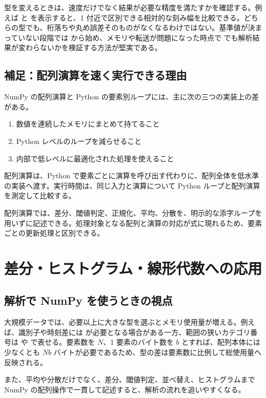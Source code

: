 型を変えるときは、速度だけでなく結果が必要な精度を満たすかを確認する。例えば  と  を表示すると、1 付近で区別できる相対的な刻み幅を比較できる。どちらの型でも、桁落ちや丸め誤差そのものがなくなるわけではない。基準値が決まっていない段階では  から始め、メモリや転送が問題になった時点で  でも解析結果が変わらないかを検証する方法が堅実である。

\subsection{補足：配列演算を速く実行できる理由}

NumPy の配列演算と Python の要素別ループには、主に次の三つの実装上の差がある。

\begin{enumerate}
\item 数値を連続したメモリにまとめて持てること
\item Python レベルのループを減らせること
\item 内部で低レベルに最適化された処理を使えること
\end{enumerate}

配列演算は、Python で要素ごとに演算を呼び出す代わりに、配列全体を低水準の実装へ渡す。実行時間は、同じ入力と演算について Python ループと配列演算を測定して比較する。

配列演算では、差分、閾値判定、正規化、平均、分散を、明示的な添字ループを用いずに記述できる。処理対象となる配列と演算の対応が式に現れるため、要素ごとの更新処理と区別できる。

\section{差分・ヒストグラム・線形代数への応用}

\subsection{解析で NumPy を使うときの視点}

大規模データでは、必要以上に大きな型を選ぶとメモリ使用量が増える。例えば、識別子や時刻差には  が必要となる場合がある一方、範囲の狭いカテゴリ番号は  や  で表せる。要素数を \(N\)、1 要素のバイト数を \(b\) とすれば、配列本体には少なくとも \(Nb\) バイトが必要であるため、型の差は要素数に比例して総使用量へ反映される。

また、平均や分散だけでなく、差分、閾値判定、並べ替え、ヒストグラムまで NumPy の配列操作で一貫して記述すると、解析の流れを追いやすくなる。

